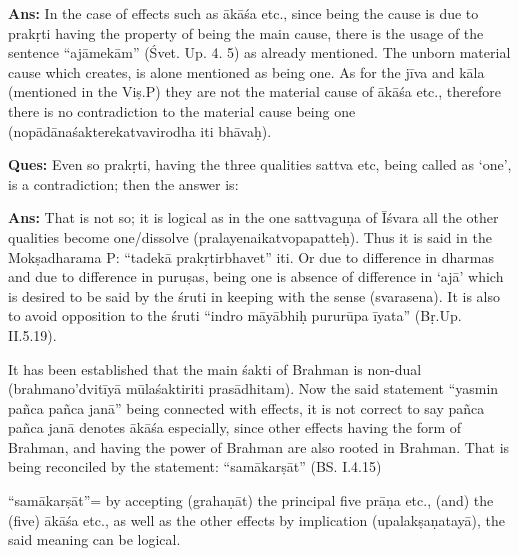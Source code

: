 
\textbf{Ans:} In the case of effects such as ākāśa etc., since being the cause is due to prakṛti having the property of being the main cause, there is the usage of the sentence “ajāmekām” (Śvet. Up. 4. 5) as already mentioned. The unborn material cause which creates, is alone mentioned as being one. As for the jīva and kāla (mentioned in the Viṣ.P) they are not the material cause of ākāśa etc., therefore there is no contradiction to the material cause being one (nopādānaśakterekatvavirodha iti bhāvaḥ).

\textbf{Ques:} Even so prakṛti, having the three qualities sattva etc, being called as ‘one’, is a contradiction; then the answer is:

\textbf{Ans:} That is not so; it is logical as in the one sattvaguṇa of Īśvara all the other qualities become one/dissolve (pralayenaikatvopapatteḥ). Thus it is said in the Mokṣadharama P: “tadekā prakṛtirbhavet” iti. Or due to difference in dharmas and due to difference in puruṣas, being one is absence of difference in ‘ajā’ which is desired to be said by the śruti in keeping with the sense (svarasena). It is also to avoid opposition to the śruti “indro māyābhiḥ pururūpa īyata” (Bṛ.Up. II.5.19). 

It has been established that the main śakti of Brahman is non-dual (brahmano’dvitīyā mūlaśaktiriti prasādhitam). Now the said statement “yasmin pañca pañca janā” being connected with effects, it is not correct to say pañca pañca janā denotes ākāśa especially, since other effects having the form of Brahman, and having the power of Brahman are also rooted in Brahman. That is being reconciled by the statement: “samākarṣāt” (BS. I.4.15)

\textbf{}



“samākarṣāt”= by accepting (grahaṇāt) the principal five prāṇa etc., (and) the (five) ākāśa etc., as well as the other effects by implication (upalakṣaṇatayā), the said meaning can be logical. 

